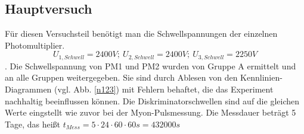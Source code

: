                 \subsection{Hauptversuch}
                Für diesen Versuchsteil benötigt man die Schwellspannungen der einzelnen Photomultiplier. $$ U_{1,Schwell} = 2400\unit{V};\ U_{2,Schwell} = 2400\unit{V};\ U_{3,Schwell} = 2250\unit{V} $$. Die Schwellspannung von PM1 und PM2 wurden von Gruppe A ermittelt und an alle Gruppen weitergegeben. Sie sind durch Ablesen von den Kennlinien-Diagrammen (vgl. Abb. \ref{n123}) mit Fehlern behaftet, die das Experiment nachhaltig beeinflussen können.
                Die Diskriminatorschwellen sind auf die gleichen Werte eingstellt wie zuvor bei der Myon-Pulsmessung.
                Die Messdauer beträgt 5 Tage, das heißt $t_{Mess} = 5\cdot24\cdot60\cdot60\unit{s} = 432000\unit{s}$